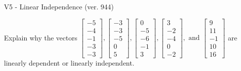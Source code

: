 \begin{exercise}
  \begin{exerciseTitle}V5 - Linear Independence (ver. 944)\end{exerciseTitle}
  \begin{exerciseStatement}
    Explain why the vectors \(\left[\begin{array}{r}
-5 \\
-4 \\
-1 \\
-3 \\
-3
\end{array}\right] , \left[\begin{array}{r}
-3 \\
-3 \\
-5 \\
0 \\
5
\end{array}\right] , \left[\begin{array}{r}
0 \\
-5 \\
-6 \\
-1 \\
3
\end{array}\right] , \left[\begin{array}{r}
3 \\
-2 \\
-4 \\
0 \\
-2
\end{array}\right] , \text{ and } \left[\begin{array}{r}
9 \\
11 \\
-1 \\
10 \\
16
\end{array}\right]\) are linearly dependent or linearly independent.	



\end{exerciseStatement}
\end{exercise}
